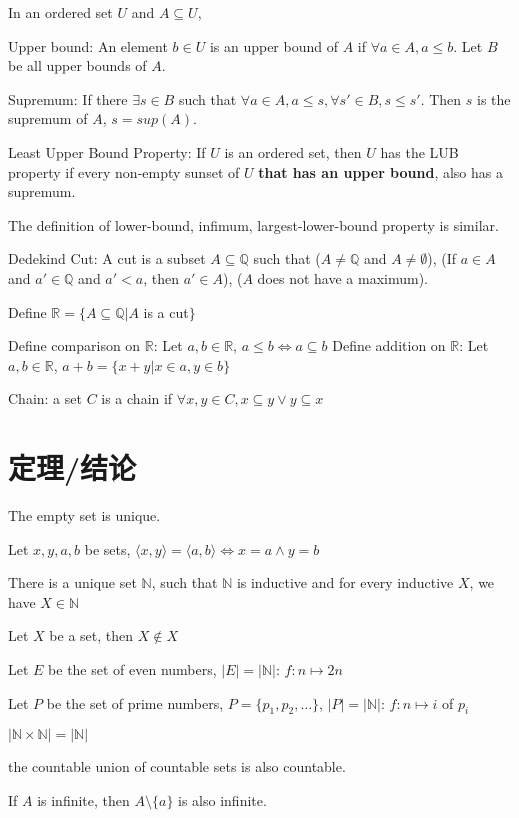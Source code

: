\documentclass[12pt,a4paper]{ctexrep}
\begin{document}
In an ordered set $U$ and $A \subseteq U$,

Upper bound: An element $b \in U$ is an upper bound of $A$ if $\forall a \in A, a \leqslant b$. Let $B$ be all upper bounds of $A$.

Supremum: If there $\exists s \in B$ such that $\forall a \in A, a \leqslant s, \forall s' \in B, s \leqslant s'$. Then $s$ is the supremum of $A$, $s = sup(A)$.

Least Upper Bound Property: If $U$ is an ordered set, then $U$ has the LUB property if every non-empty sunset of $U$ \textbf{that has an upper bound}, also has a supremum.

The definition of lower-bound, infimum, largest-lower-bound property is similar.

Dedekind Cut: A cut is a subset $A \subseteq \mathbb{Q}$ such that ($A \neq \mathbb{Q}$ and $A \neq \emptyset$), (If $a \in A$ and $a' \in \mathbb{Q}$ and $a' < a$, then $a' \in A$), ($A$ does not have a maximum).

Define $\mathbb{R} = \{A \subseteq \mathbb{Q}|A$ is a cut$\}$

Define comparison on $\mathbb{R}$: Let $a,b \in \mathbb{R}$, $a \leqslant b \iff a \subseteq b$
Define addition on $\mathbb{R}$: Let $a,b \in \mathbb{R}$, $a+b = \{x+y|x \in a, y \in b\}$

Chain: a set $C$ is a chain if $\forall x,y \in C, x \subseteq y \vee y \subseteq x$
\section{定理/结论}
The empty set is unique.

Let $x,y,a,b$ be sets, $\langle x,y \rangle = \langle a,b \rangle \iff x=a \wedge y=b$

There is a unique set $\mathbb{N}$, such that $\mathbb{N}$ is inductive and for every inductive $X$, we have $X\in \mathbb{N}$

Let $X$ be a set, then $X \notin X$

Let $E$ be the set of even numbers, $|E|=|\mathbb{N}|$: $f:n\mapsto 2n$

Let $P$ be the set of prime numbers, $P=\{p_1,p_2,\dots\}$, $|P|=|\mathbb{N}|$: $f:n \mapsto i$ of $p_i$

$|\mathbb{N} \times \mathbb{N}| = |\mathbb{N}|$

the countable union of countable sets is also countable.

If $A$ is infinite, then $A\setminus \{a\}$ is also infinite.
\end{document}
